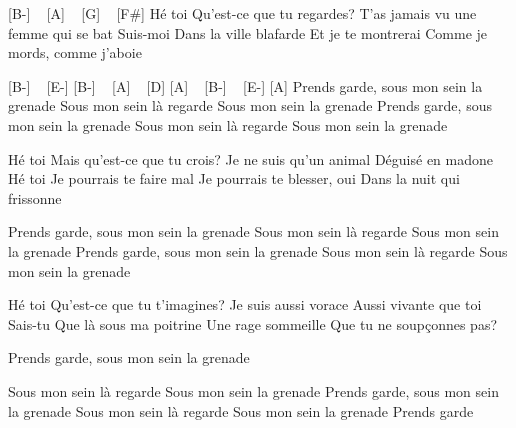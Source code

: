 [B-] ~ [A] ~ [G] ~ [F#]
Hé toi
Qu'est-ce que tu regardes?
T'as jamais vu une femme qui se bat
Suis-moi
Dans la ville blafarde
Et je te montrerai
Comme je mords, comme j'aboie

[B-] ~ [E-] [B-] ~ [A] ~ [D] [A] ~ [B-] ~ [E-] [A]
Prends garde, sous mon sein la grenade
Sous mon sein là regarde
Sous mon sein la grenade
Prends garde, sous mon sein la grenade
Sous mon sein là regarde
Sous mon sein la grenade

Hé toi
Mais qu'est-ce que tu crois?
Je ne suis qu'un animal
Déguisé en madone
Hé toi
Je pourrais te faire mal
Je pourrais te blesser, oui
Dans la nuit qui frissonne


Prends garde, sous mon sein la grenade
Sous mon sein là regarde
Sous mon sein la grenade
Prends garde, sous mon sein la grenade
Sous mon sein là regarde
Sous mon sein la grenade

Hé toi
Qu'est-ce que tu t'imagines?
Je suis aussi vorace
Aussi vivante que toi
Sais-tu
Que là sous ma poitrine
Une rage sommeille
Que tu ne soupçonnes pas?

Prends garde, sous mon sein la grenade

Sous mon sein là regarde
Sous mon sein la grenade
Prends garde, sous mon sein la grenade
Sous mon sein là regarde
Sous mon sein la grenade
Prends garde


